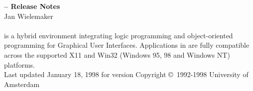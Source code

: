 \titlepageheader
\vfil

\noindent
{\bf \product{}--\productversion{} Release Notes} \\[2cm]
Jan Wielemaker \\
 \\
\vfil
\noindent
\productpl{} is a hybrid environment integrating logic programming and
object-oriented programming for Graphical User Interfaces.  Applications
in \productpl{} are fully compatible across the supported X11 and
Win32 (Windows 95, 98 and Windows NT) platforms.\\[10pt]
\vfil\vfil
\noindent
Last updated January 18, 1998 for \product{} version \productversion
\vfil
\noindent
Copyright \copyright\ 1992-1998 University of Amsterdam
